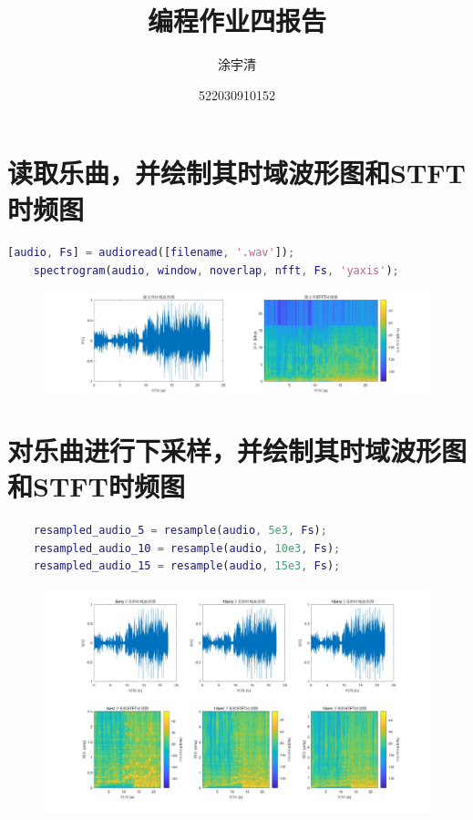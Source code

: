 \documentclass[UTF8,a4paper,11pt]{ctexart}
\title{\textbf{\Large{编程作业四报告}}}
\author{涂宇清}
\date{522030910152}
\begin{document}
 
\maketitle
\setcounter{page}{1}        %
 
 
\section{读取乐曲，并绘制其时域波形图和STFT时频图}

\begin{lstlisting}[language=matlab]
    [audio, Fs] = audioread([filename, '.wav']);
    spectrogram(audio, window, noverlap, nfft, Fs, 'yaxis');
\end{lstlisting}

\begin{figure}[H]   %
    \includegraphics[width=\linewidth]{PA4_1.jpg}
\end{figure}

\section{对乐曲进行下采样，并绘制其时域波形图和STFT时频图}
\begin{lstlisting}[language=matlab]
    % 分别以5kHz、10kHz、15kHz的采样率对乐曲进行下采样
    resampled_audio_5 = resample(audio, 5e3, Fs);
    resampled_audio_10 = resample(audio, 10e3, Fs);
    resampled_audio_15 = resample(audio, 15e3, Fs);
\end{lstlisting}

\begin{figure}[H]   %
    \includegraphics[width=\linewidth]{PA4_2.jpg}
\end{figure}
\end{document}
